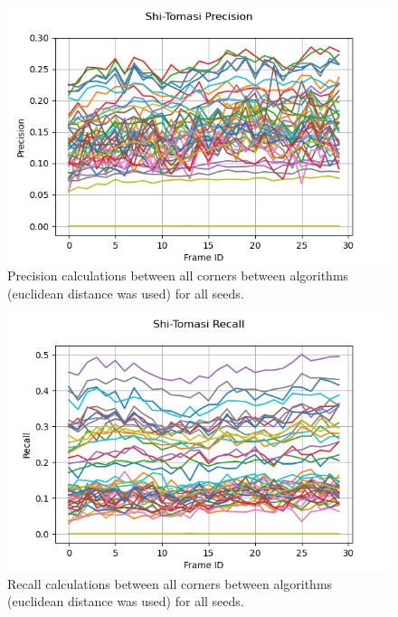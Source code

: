 \documentclass[11pt, conference, letterpaper]{IEEEtran}
\begin{document}
\begin{figure}[h!]
    \centering
    \includegraphics[width=\linewidth]{mc_images/mc_stc_precision.png}
    \caption{Precision calculations between all corners between algorithms (euclidean distance was used) for all seeds.}
    \label{fig:mc_stc_prec}
\end{figure}

\begin{figure}[h!]
    \centering
    \includegraphics[width=\linewidth]{mc_images/mc_stc_recall.png}
    \caption{Recall calculations between all corners between algorithms (euclidean distance was used) for all seeds.}
    \label{fig:mc_stc_rec}
\end{figure}
\end{document}
